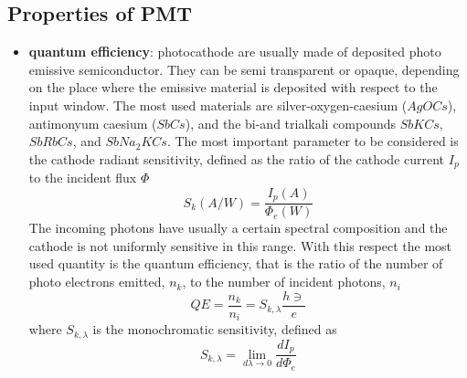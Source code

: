 \subsection{Properties of PMT}
\begin{itemize}
\item \textbf{quantum efficiency}: photocathode are usually made of deposited photo emissive semiconductor. They can be semi transparent or opaque, depending on the place where the emissive material is deposited with respect to the input window.
The most used materials are silver-oxygen-caesium ($AgOCs$), antimonyum caesium ($SbCs$), and the bi-and trialkali compounds $SbKCs$, $SbRbCs$, and $SbNa_{2}KCs$. The most important parameter to be considered is the cathode radiant sensitivity, defined as the ratio of the cathode current $I_{p}$ to the incident flux $\Phi$
\begin{equation}
S_{k}(A/W)=\frac{I_{p}(A)}{\Phi _{e}(W)}
\end{equation}
The incoming photons have usually a certain spectral composition and the cathode is not uniformly sensitive in this range. With this respect the most used quantity is the quantum efficiency, that is the ratio of the number of photo electrons emitted, $n_{k}$, to the number of incident photons, $n_{i}$
\begin{equation}
QE = \frac{n_{k}}{n_{i}} = S_{k, \lambda} \frac{h\ni}{e}
\end{equation}
where $S_{k, \lambda}$ is the monochromatic sensitivity, defined as
\begin{equation}
S_{k, \lambda} = \lim_{d\lambda \to 0}\frac{dI_{p}}{d\Phi _{e}}
\end{equation}


\end{itemize}

